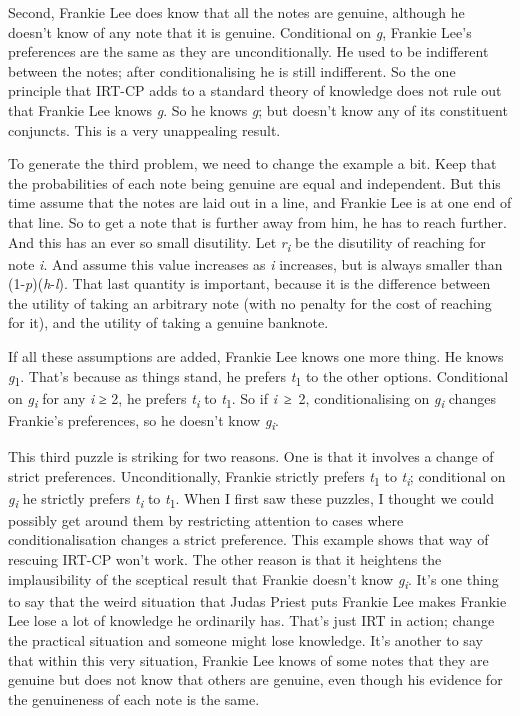 \documentclass[
  10pt,
  letterpaper,
  twoside]{scrbook}
\begin{document}
Second, Frankie Lee does know that all the notes are genuine, although
he doesn't know of any note that it is genuine. Conditional on \emph{g},
Frankie Lee's preferences are the same as they are unconditionally. He
used to be indifferent between the notes; after conditionalising he is
still indifferent. So the one principle that IRT-CP adds to a standard
theory of knowledge does not rule out that Frankie Lee knows \emph{g}.
So he knows \emph{g}; but doesn't know any of its constituent conjuncts.
This is a very unappealing result.

To generate the third problem, we need to change the example a bit. Keep
that the probabilities of each note being genuine are equal and
independent. But this time assume that the notes are laid out in a line,
and Frankie Lee is at one end of that line. So to get a note that is
further away from him, he has to reach further. And this has an ever so
small disutility. Let \emph{r\textsubscript{i}} be the disutility of
reaching for note \emph{i}. And assume this value increases as \emph{i}
increases, but is always smaller than (1-\emph{p})(\emph{h}-\emph{l}).
That last quantity is important, because it is the difference between
the utility of taking an arbitrary note (with no penalty for the cost of
reaching for it), and the utility of taking a genuine banknote.

If all these assumptions are added, Frankie Lee knows one more thing. He
knows \emph{g}\textsubscript{1}. That's because as things stand, he
prefers \emph{t}\textsubscript{1} to the other options. Conditional on
\emph{g\textsubscript{i}} for any \emph{i} ≥ 2, he prefers
\emph{t\textsubscript{i}} to \emph{t}\textsubscript{1}. So if
\emph{i}~≥~2, conditionalising on \emph{g\textsubscript{i}} changes
Frankie's preferences, so he doesn't know \emph{g\textsubscript{i}}.

This third puzzle is striking for two reasons. One is that it involves a
change of strict preferences. Unconditionally, Frankie strictly prefers
\emph{t}\textsubscript{1} to \emph{t\textsubscript{i}}; conditional on
\emph{g\textsubscript{i}} he strictly prefers \emph{t\textsubscript{i}}
to \emph{t}\textsubscript{1}. When I first saw these puzzles, I thought
we could possibly get around them by restricting attention to cases
where conditionalisation changes a strict preference. This example shows
that way of rescuing IRT-CP won't work. The other reason is that it
heightens the implausibility of the sceptical result that Frankie
doesn't know \emph{g\textsubscript{i}}. It's one thing to say that the
weird situation that Judas Priest puts Frankie Lee makes Frankie Lee
lose a lot of knowledge he ordinarily has. That's just IRT in action;
change the practical situation and someone might lose knowledge. It's
another to say that within this very situation, Frankie Lee knows of
some notes that they are genuine but does not know that others are
genuine, even though his evidence for the genuineness of each note is
the same.
\end{document}
